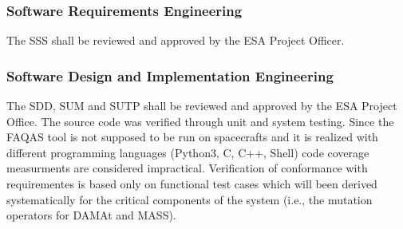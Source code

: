 
\subsubsection{Software Requirements Engineering}
The SSS shall be reviewed and approved by the ESA Project Officer.

\subsubsection{Software Design and Implementation Engineering}
The SDD, SUM and SUTP shall be reviewed and approved by the ESA Project Office.
The source code was verified through unit and system testing.
Since the FAQAS tool is not supposed to be run on spacecrafts and it is realized with different programming languages (Python3, C, C++, Shell) code coverage measurments are considered impractical.
Verification of conformance with requirementes is based only on functional test cases which will been derived systematically for the critical components of the system (i.e., the mutation operators for DAMAt and MASS).

